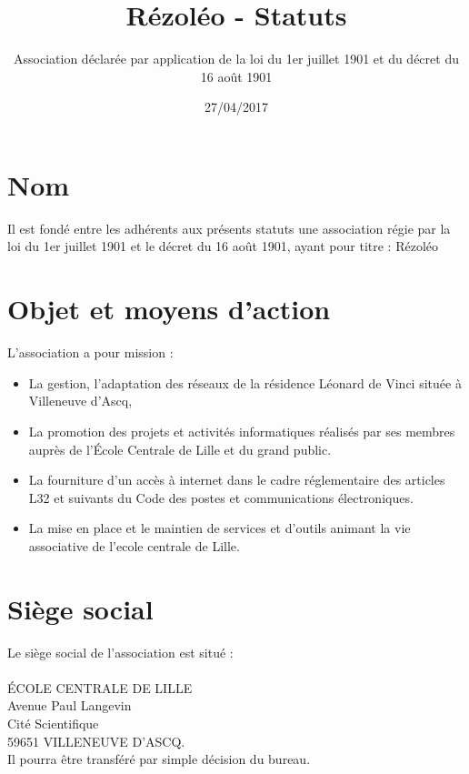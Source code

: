 \documentclass[12pt]{constitution}
\begin{document}
	\title{Rézoléo - Statuts}
	\author{Association déclarée par application de la loi du 1er juillet 1901 et du décret du 16 août 1901}
	\date{27/04/2017}
	\maketitle
	\newpage
	
	\section{Nom}
Il est fondé entre les adhérents aux présents statuts une association régie par la loi du 1er juillet 1901 et le décret du 16 août 1901, ayant pour titre : Rézoléo
	
	\section{Objet et moyens d'action}
	L’association a pour mission :
	\begin{itemize}
		\item[\textbullet] La gestion, l'adaptation des réseaux de la résidence Léonard de Vinci située à Villeneuve d'Ascq,
		\item[\textbullet]La promotion des projets et activités informatiques réalisés par ses membres auprès de l’École Centrale de Lille et du grand public.
		\item[\textbullet] La fourniture d'un accès à internet dans le cadre réglementaire des articles L32 et suivants du Code des postes et communications électroniques.
		\item[\textbullet] La mise en place et le maintien de services et d'outils animant la vie associative de l'ecole centrale de Lille.
	\end{itemize}
	
	\section{Siège social}
	Le siège social de l'association est situé :\\
	\\
	\noindent ÉCOLE CENTRALE DE LILLE \\
	Avenue Paul Langevin \\
	Cité Scientifique \\
	59651 VILLENEUVE D’ASCQ. \\
	Il pourra être transféré par simple décision du bureau.
	
\end{document}
